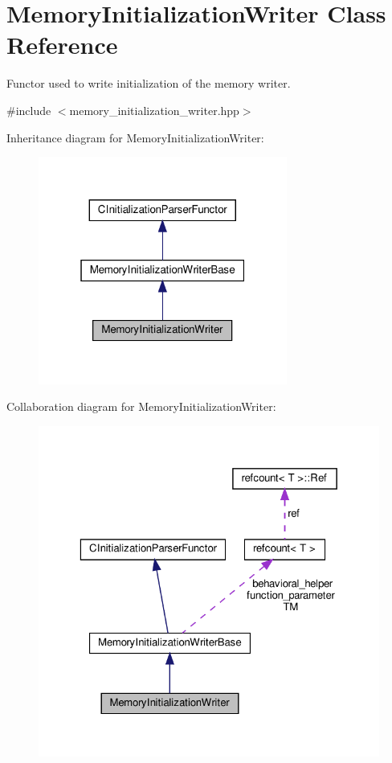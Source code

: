 \hypertarget{classMemoryInitializationWriter}{}\section{Memory\+Initialization\+Writer Class Reference}
\label{classMemoryInitializationWriter}


Functor used to write initialization of the memory writer.  




{\ttfamily \#include $<$memory\+\_\+initialization\+\_\+writer.\+hpp$>$}



Inheritance diagram for Memory\+Initialization\+Writer\+:
\nopagebreak
\begin{figure}[H]
\begin{center}
\leavevmode
\includegraphics[width=232pt]{de/da4/classMemoryInitializationWriter__inherit__graph}
\end{center}
\end{figure}


Collaboration diagram for Memory\+Initialization\+Writer\+:
\nopagebreak
\begin{figure}[H]
\begin{center}
\leavevmode
\includegraphics[width=323pt]{db/dd6/classMemoryInitializationWriter__coll__graph}
\end{center}
\end{figure}
